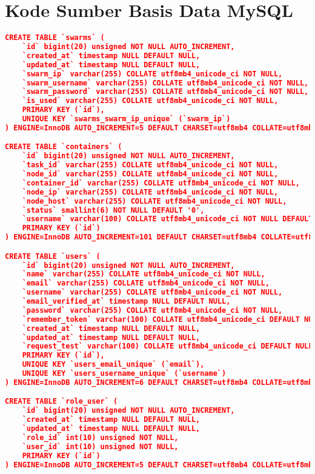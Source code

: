 \section*{Kode Sumber Basis Data MySQL} \label{mysql}
	
\begin{lstlisting}[frame=single,tabsize=2,breaklines,caption={Basis data MySQL},label=mysql, captionpos=b, language=json]
CREATE TABLE `swarms` (
	`id` bigint(20) unsigned NOT NULL AUTO_INCREMENT,
	`created_at` timestamp NULL DEFAULT NULL,
	`updated_at` timestamp NULL DEFAULT NULL,
	`swarm_ip` varchar(255) COLLATE utf8mb4_unicode_ci NOT NULL,
	`swarm_username` varchar(255) COLLATE utf8mb4_unicode_ci NOT NULL,
	`swarm_password` varchar(255) COLLATE utf8mb4_unicode_ci NOT NULL,
	`is_used` varchar(255) COLLATE utf8mb4_unicode_ci NOT NULL,
	PRIMARY KEY (`id`),
	UNIQUE KEY `swarms_swarm_ip_unique` (`swarm_ip`)
) ENGINE=InnoDB AUTO_INCREMENT=5 DEFAULT CHARSET=utf8mb4 COLLATE=utf8mb4_unicode_ci;

CREATE TABLE `containers` (
	`id` bigint(20) unsigned NOT NULL AUTO_INCREMENT,
	`task_id` varchar(255) COLLATE utf8mb4_unicode_ci NOT NULL,
	`node_id` varchar(255) COLLATE utf8mb4_unicode_ci NOT NULL,
	`container_id` varchar(255) COLLATE utf8mb4_unicode_ci NOT NULL,
	`node_ip` varchar(255) COLLATE utf8mb4_unicode_ci NOT NULL,
	`node_host` varchar(255) COLLATE utf8mb4_unicode_ci NOT NULL,
	`status` smallint(6) NOT NULL DEFAULT '0',
	`username` varchar(100) COLLATE utf8mb4_unicode_ci NOT NULL DEFAULT '0',
	PRIMARY KEY (`id`)
) ENGINE=InnoDB AUTO_INCREMENT=101 DEFAULT CHARSET=utf8mb4 COLLATE=utf8mb4_unicode_ci;

CREATE TABLE `users` (
	`id` bigint(20) unsigned NOT NULL AUTO_INCREMENT,
	`name` varchar(255) COLLATE utf8mb4_unicode_ci NOT NULL,
	`email` varchar(255) COLLATE utf8mb4_unicode_ci NOT NULL,
	`username` varchar(255) COLLATE utf8mb4_unicode_ci NOT NULL,
	`email_verified_at` timestamp NULL DEFAULT NULL,
	`password` varchar(255) COLLATE utf8mb4_unicode_ci NOT NULL,
	`remember_token` varchar(100) COLLATE utf8mb4_unicode_ci DEFAULT NULL,
	`created_at` timestamp NULL DEFAULT NULL,
	`updated_at` timestamp NULL DEFAULT NULL,
	`request_test` varchar(100) COLLATE utf8mb4_unicode_ci DEFAULT NULL,
	PRIMARY KEY (`id`),
	UNIQUE KEY `users_email_unique` (`email`),
	UNIQUE KEY `users_username_unique` (`username`)
) ENGINE=InnoDB AUTO_INCREMENT=6 DEFAULT CHARSET=utf8mb4 COLLATE=utf8mb4_unicode_ci;

CREATE TABLE `role_user` (
	`id` bigint(20) unsigned NOT NULL AUTO_INCREMENT,
	`created_at` timestamp NULL DEFAULT NULL,
	`updated_at` timestamp NULL DEFAULT NULL,
	`role_id` int(10) unsigned NOT NULL,
	`user_id` int(10) unsigned NOT NULL,
	PRIMARY KEY (`id`)
) ENGINE=InnoDB AUTO_INCREMENT=5 DEFAULT CHARSET=utf8mb4 COLLATE=utf8mb4_unicode_ci;


\end{lstlisting}
